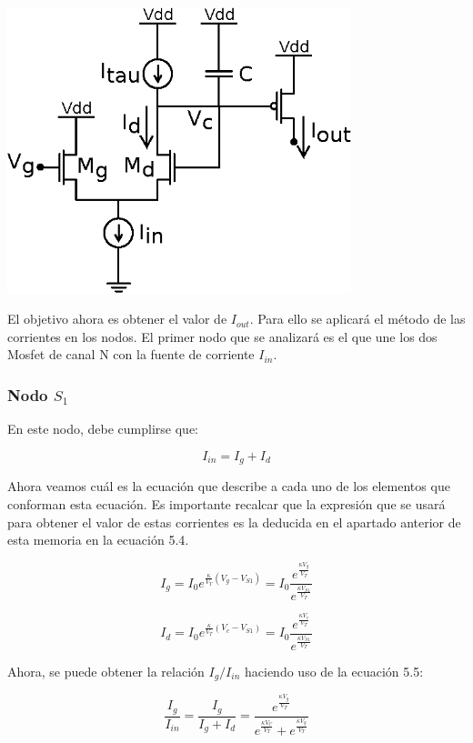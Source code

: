 	\begin{center}
		\includegraphics[width=10cm]{Imagenes/Sinaptico/Inicial.eps}
    		\label{Inicial}
	\end{center}	

El objetivo ahora es obtener el valor de $I_{out}$. Para ello se aplicará el método de las corrientes en los nodos. El primer nodo que se analizará es el que une los dos Mosfet de canal N con la fuente de corriente $I_{in}$. 

\subsubsection{Nodo $S_1$}
En este nodo, debe cumplirse que:

\begin{equation}
I_{in}=I_g+I_d
\end{equation}

Ahora veamos cuál es la ecuación que describe a cada uno de los elementos que conforman esta ecuación. Es importante recalcar que la expresión que se usará para obtener el valor de estas corrientes es la deducida en el apartado anterior de esta memoria en la ecuación 5.4. 

$$I_g=I_0e^{\frac{\kappa}{V_T}(V_g-V_{S1})}=I_0\frac{e^{\frac{\kappa V_g}{V_T}}}{e^{\frac{\kappa V_{S1}}{V_T}}}$$

$$I_d=I_0e^{\frac{\kappa}{V_T}(V_c-V_{S1})}=I_0\frac{e^{\frac{\kappa V_c}{V_T}}}{e^{\frac{\kappa V_{S1}}{V_T}}}$$

Ahora, se puede obtener la relación $I_g/I_{in}$ haciendo uso de la ecuación 5.5:

$$\frac{I_g}{I_{in}}=\frac{I_g}{I_g+I_d}=\frac{e^{\frac{\kappa V_g}{V_T}}}{e^{\frac{\kappa V_C}{V_T}}+e^{\frac{\kappa V_g}{V_T}}}$$


